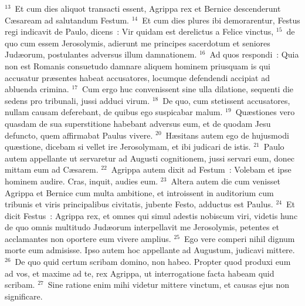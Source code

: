 ${}^{13}$~Et cum dies aliquot transacti essent, Agrippa rex et Bernice descenderunt C\ae saream ad salutandum Festum.
${}^{14}$~Et cum dies plures ibi demorarentur, Festus regi indicavit de Paulo, dicens~: Vir quidam est derelictus a Felice vinctus,
${}^{15}$~de quo cum essem Jerosolymis, adierunt me principes sacerdotum et seniores Jud\ae orum, postulantes adversus illum damnationem.
${}^{16}$~Ad quos respondi~: Quia non est Romanis consuetudo damnare aliquem hominem priusquam is qui accusatur pr\ae sentes habeat accusatores, locumque defendendi accipiat ad abluenda crimina.
${}^{17}$~Cum ergo huc convenissent sine ulla dilatione, sequenti die sedens pro tribunali, jussi adduci virum.
${}^{18}$~De quo, cum stetissent accusatores, nullam causam deferebant, de quibus ego suspicabar malum.
${}^{19}$~Qu\ae stiones vero quasdam de sua superstitione habebant adversus eum, et de quodam Jesu defuncto, quem affirmabat Paulus vivere.
${}^{20}$~H\ae sitans autem ego de hujusmodi qu\ae stione, dicebam si vellet ire Jerosolymam, et ibi judicari de istis.
${}^{21}$~Paulo autem appellante ut servaretur ad Augusti cognitionem, jussi servari eum, donec mittam eum ad C\ae sarem.
${}^{22}$~Agrippa autem dixit ad Festum~: Volebam et ipse hominem audire. Cras, inquit, audies eum.
${}^{23}$~Altera autem die cum venisset Agrippa et Bernice cum multa ambitione, et introissent in auditorium cum tribunis et viris principalibus civitatis, jubente Festo, adductus est Paulus.
${}^{24}$~Et dicit Festus~: Agrippa rex, et omnes qui simul adestis nobiscum viri, videtis hunc de quo omnis multitudo Jud\ae orum interpellavit me Jerosolymis, petentes et acclamantes non oportere eum vivere amplius.
${}^{25}$~Ego vere comperi nihil dignum morte eum admisisse. Ipso autem hoc appellante ad Augustum, judicavi mittere.
${}^{26}$~De quo quid certum scribam domino, non habeo. Propter quod produxi eum ad vos, et maxime ad te, rex Agrippa, ut interrogatione facta habeam quid scribam.
${}^{27}$~Sine ratione enim mihi videtur mittere vinctum, et causas ejus non significare.

